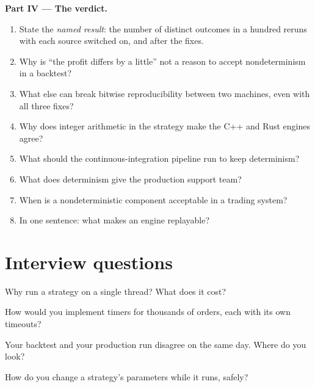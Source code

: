 \begin{problem}
\medskip\noindent\textbf{Part IV --- The verdict.}
\begin{enumerate}[resume]
\item State the \emph{named result}: the number of distinct outcomes in a hundred reruns with each source switched on, and after
the fixes.
\item Why is ``the profit differs by a little'' not a reason to accept nondeterminism in a backtest?
\item What else can break bitwise reproducibility between two machines, even with all three fixes?
\item Why does integer arithmetic in the strategy make the C++ and Rust engines agree?
\item What should the continuous-integration pipeline run to keep determinism?
\item What does determinism give the production support team?
\item When is a nondeterministic component acceptable in a trading system?
\item In one sentence: what makes an engine replayable?
\end{enumerate}
\end{problem}

\section{Interview questions}

\begin{interviewq}\label{iq:ll:the-strategy-engine:1}
Why run a strategy on a single thread? What does it cost?
\end{interviewq}

\begin{interviewq}\label{iq:ll:the-strategy-engine:2}
How would you implement timers for thousands of orders, each with its own timeouts?
\end{interviewq}

\begin{interviewq}\label{iq:ll:the-strategy-engine:3}
Your backtest and your production run disagree on the same day. Where do you look?
\end{interviewq}

\begin{interviewq}\label{iq:ll:the-strategy-engine:4}
How do you change a strategy's parameters while it runs, safely?
\end{interviewq}

